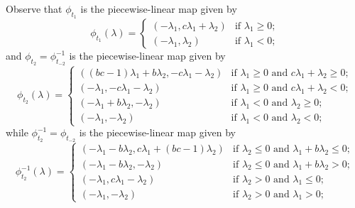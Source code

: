 \documentclass{amsart}
\numberwithin{theorem}{section}
\begin{document}
  Observe that $\phi_{t_1}$ is the piecewise-linear map given by
  \begin{equation}
    \label{eq:forward mutation 1}
    \phi_{t_1}(\lambda)=\begin{cases} (-\lambda_1,c\lambda_1+\lambda_2) & \text{if $\lambda_1\ge0$;}\\ (-\lambda_1,\lambda_2) & \text{if $\lambda_1<0$;} \end{cases}
  \end{equation}
  and $\phi_{t_2}=\phi_{t_{-2}}^{-1}$ is the piecewise-linear map given by
  \begin{equation}
    \label{eq:forward two step mutation}
    \phi_{t_2}(\lambda)=\begin{cases} ((bc-1)\lambda_1+b\lambda_2, -c\lambda_1-\lambda_2) & \text{if $\lambda_1\ge 0$ and $c\lambda_1+\lambda_2\ge 0$;}\\ (-\lambda_1, -c\lambda_1-\lambda_2) & \text{if $\lambda_1\ge 0$ and $c\lambda_1+\lambda_2<0$;}\\ (-\lambda_1+b\lambda_2, -\lambda_2) & \text{if $\lambda_1<0$ and $\lambda_2\ge 0$;}\\ (-\lambda_1,-\lambda_2) & \text{if $\lambda_1<0$ and $\lambda_2<0$;}\end{cases}
  \end{equation}
  while $\phi_{t_2}^{-1}=\phi_{t_{-2}}$ is the piecewise-linear map given by
  \begin{equation}
    \label{eq:backward two step mutation}
    \phi_{t_2}^{-1}(\lambda)=\begin{cases} (-\lambda_1-b\lambda_2, c\lambda_1+(bc-1)\lambda_2) & \text{if $\lambda_2\le 0$ and $\lambda_1+b\lambda_2\le 0$;}\\ (-\lambda_1-b\lambda_2, -\lambda_2) & \text{if $\lambda_2\le 0$ and $\lambda_1+b\lambda_2>0$;}\\ (-\lambda_1, c\lambda_1-\lambda_2) & \text{if $\lambda_2>0$ and $\lambda_1\le 0$;}\\ (-\lambda_1,-\lambda_2) & \text{if $\lambda_2>0$ and $\lambda_1>0$;}\end{cases}
  \end{equation}
\end{document}
